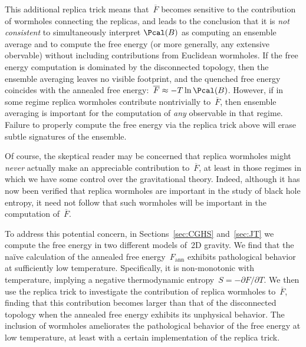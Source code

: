 \documentclass[12pt]{article}
\begin{document}
This additional replica trick means that~$\overline{F}$ becomes sensitive to the contribution of wormholes connecting the replicas, and leads to the conclusion that it is \textit{not consistent} to simultaneously interpret $\Pcal(B)$ as computing an ensemble average and to compute the free energy (or more generally, any extensive obervable) without including contributions from Euclidean wormholes.  If the free energy computation is dominated by the disconnected topology, then the ensemble averaging leaves no visible footprint, and the quenched free energy coincides with the annealed free energy:~$\overline{F} \approx -T \ln \Pcal(B)$.  However, if in some regime replica wormholes contribute nontrivially to~$\overline{F}$, then ensemble averaging is important for the computation of \textit{any} observable in that regime. Failure to properly compute the free energy via the replica trick above will erase subtle signatures of the ensemble.

Of course, the skeptical reader may be concerned that replica wormholes might \textit{never} actually make an appreciable contribution to~$\overline{F}$, at least in those regimes in which we have some control over the gravitational theory.  Indeed, although it has now been verified that replica wormholes are important in the study of black hole entropy, it need not follow that such wormholes will be important in the computation of~$\overline{F}$.

To address  this potential concern, in Sections~\ref{sec:CGHS} and~\ref{sec:JT} we compute the free energy in two different models of~2D gravity.  We find that the na\"ive calculation of the annealed free energy~$F_\mathrm{ann}$ exhibits pathological behavior at sufficiently low temperature.  Specifically, it is non-monotonic with temperature, implying a negative thermodynamic entropy~$S = - \partial F/\partial T$.  We then use the replica trick to investigate the contribution of replica wormholes to~$\overline{F}$, finding that this contribution becomes larger than that of the disconnected topology when the annealed free energy exhibits its unphysical behavior.  The inclusion of wormholes ameliorates the pathological behavior of the free energy at low temperature, at least with a certain implementation of the replica trick.
\end{document}
